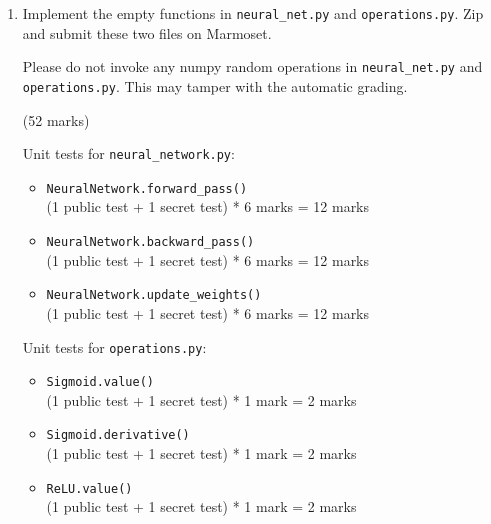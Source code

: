 \documentclass[12pt]{article}
\begin{document}
\begin{enumerate}[font=\Large,label=(\alph*)]

\item 
Implement the empty functions in \verb+neural_net.py+ and \verb+operations.py+. Zip and submit these two files on Marmoset.

Please do not invoke any numpy random operations in \verb+neural_net.py+ and \\ \verb+operations.py+. This may tamper with the automatic grading.
    
\begin{markscheme}
(52 marks)

Unit tests for \texttt{neural\_network.py}:
\begin{itemize}
    
    \item \verb+NeuralNetwork.forward_pass()+ \\
    (1 public test + 1 secret test) * 6 marks = 12 marks
    
    \item \verb+NeuralNetwork.backward_pass()+ \\
    (1 public test + 1 secret test) * 6 marks = 12 marks

    \item \verb+NeuralNetwork.update_weights()+ \\
    (1 public test + 1 secret test) * 6 marks = 12 marks
\end{itemize}

Unit tests for \texttt{operations.py}:
\begin{itemize}
    
    \item \verb+Sigmoid.value()+ \\
    (1 public test + 1 secret test) * 1 mark = 2 marks
    
    \item \verb+Sigmoid.derivative()+ \\
    (1 public test + 1 secret test) * 1 mark = 2 marks

    

    \item \verb+ReLU.value()+ \\
    (1 public test + 1 secret test) * 1 mark = 2 marks
    

\end{itemize}
\end{markscheme}
\end{enumerate}
\end{document}
